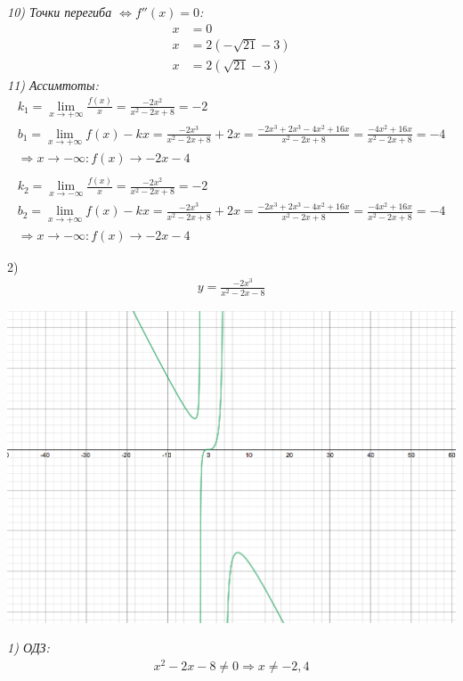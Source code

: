 \documentclass[a4paper,11pt]{article}
\begin{document}
\noindent \textsl{10) Точки перегиба   $\Longleftrightarrow f''(x) = 0 $:}
\begin{align*}
x &= 0 \\
x &= 2(- \sqrt{21} - 3) \\
x &= 2(\sqrt{21} - 3) 
\end{align*}
\noindent \textsl{11) Ассимтоты:}
\begin{gather*}
k_1 = \lim_{x \to +\infty} \frac{f(x)}{x} = \frac{-2x^2}{x^2 - 2x + 8} = -2 \\
b_1 = \lim_{x \to +\infty} f(x) - kx = \frac{-2x^3}{x^2 - 2x + 8} + 2x = 
\frac{-2x^3 + 2x^3 - 4x^2 + 16x}{x^2 - 2x + 8} = \frac{- 4x^2 + 16x}{x^2 - 2x + 8} = -4 \\
\Rightarrow x \to -\infty: f(x) \to -2x - 4 \\ \\
k_2 = \lim_{x \to -\infty} \frac{f(x)}{x} = \frac{-2x^2}{x^2 - 2x + 8} = -2 \\
b_2 = \lim_{x \to +\infty} f(x) - kx = \frac{-2x^3}{x^2 - 2x + 8} + 2x = 
\frac{-2x^3 + 2x^3 - 4x^2 + 16x}{x^2 - 2x + 8} = \frac{- 4x^2 + 16x}{x^2 - 2x + 8} = -4 \\
\Rightarrow x \to -\infty: f(x) \to -2x - 4 
\end{gather*}
\newpage


2)
\begin{align*}
y = \frac{-2x^3}{x^2 - 2x - 8}
\end{align*}
\begin{center}
	\includegraphics[width = 150mm]{images/721.png}
\end{center}

\noindent \textsl{1) ОДЗ:}
\begin{gather*}
x^2 - 2x - 8 \neq 0 \Rightarrow x \neq -2, 4
\end{gather*}
\end{document}
